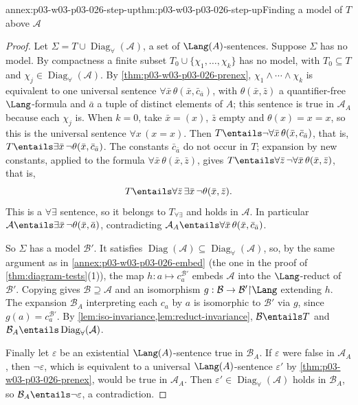 \begin{annexitem}{annex:p03-w03-p03-026-step-up}{thm:p03-w03-p03-026-step-up}{Finding a model of \(T\) above \(\mathcal A\)}
\begin{proof}
Let \(\Sigma=T\cup\operatorname{Diag}_{\forall}(\mathcal A)\), a set of
\(\Lang(A)\)-sentences.  Suppose \(\Sigma\) has no model.  By compactness a
finite subset \(T_0\cup\{\chi_1,\ldots,\chi_k\}\) has no model, with
\(T_0\subseteq T\) and \(\chi_j\in\operatorname{Diag}_{\forall}(\mathcal A)\).
By \cref{thm:p03-w03-p03-026-prenex}, \(\chi_1\land\cdots\land\chi_k\) is
equivalent to one universal sentence
\(\forall\bar x\,\theta(\bar x,\bar c_{\bar a})\), with
\(\theta(\bar x,\bar z)\) a quantifier-free \(\Lang\)-formula and \(\bar a\)
a tuple of distinct elements of \(A\); this sentence is true in
\(\mathcal A_A\) because each \(\chi_j\) is. When \(k=0\), take
\(\bar x=(x)\), \(\bar z\) empty and \(\theta(x)=x=x\), so this is
the universal sentence \(\forall x\,(x=x)\).  Then
\(T\entails\neg\forall\bar x\,\theta(\bar x,\bar c_{\bar a})\), that is,
\(T\entails\exists\bar x\,\neg\theta(\bar x,\bar c_{\bar a})\).  The
constants \(\bar c_{\bar a}\) do not occur in \(T\); expansion by new
constants, applied to the formula \(\forall\bar x\,\theta(\bar x,\bar z)\),
gives \(T\entails\forall\bar z\,\neg\forall\bar x\,\theta(\bar x,\bar z)\),
that is,
\[
 T\entails\forall\bar z\,\exists\bar x\,\neg\theta(\bar x,\bar z).
\]
This is a \(\forall\exists\) sentence, so it belongs to
\(T_{\forall\exists}\) and holds in \(\mathcal A\).  In particular
\(\mathcal A\entails\exists\bar x\,\neg\theta(\bar x,\bar a)\), contradicting
\(\mathcal A_A\entails\forall\bar x\,\theta(\bar x,\bar c_{\bar a})\).

So \(\Sigma\) has a model \(\mathcal B'\).  It satisfies
\(\operatorname{Diag}(\mathcal A)\subseteq\operatorname{Diag}_{\forall}(\mathcal A)\),
so, by the same argument as in \cref{annex:p03-w03-p03-026-embed} (the one
in the proof of \cref{thm:diagram-tests}(1)), the map
\(h:a\mapsto c_a^{\mathcal B'}\) embeds \(\mathcal A\) into the
\(\Lang\)-reduct of \(\mathcal B'\).  Copying gives
\(\mathcal B\supseteq\mathcal A\) and an isomorphism
\(g:\mathcal B\to\mathcal B'{\restriction}\Lang\) extending \(h\).  The
expansion \(\mathcal B_A\) interpreting each \(c_a\) by \(a\) is isomorphic
to \(\mathcal B'\) via \(g\), since \(g(a)=c_a^{\mathcal B'}\).  By
\cref{lem:iso-invariance,lem:reduct-invariance},
\(\mathcal B\entails T\) and
\(\mathcal B_A\entails\operatorname{Diag}_{\forall}(\mathcal A)\).

Finally let \(\varepsilon\) be an existential \(\Lang(A)\)-sentence true in
\(\mathcal B_A\).  If \(\varepsilon\) were false in \(\mathcal A_A\), then
\(\neg\varepsilon\), which is equivalent to a universal
\(\Lang(A)\)-sentence \(\varepsilon'\) by \cref{thm:p03-w03-p03-026-prenex},
would be true in \(\mathcal A_A\).  Then
\(\varepsilon'\in\operatorname{Diag}_{\forall}(\mathcal A)\) holds in
\(\mathcal B_A\), so \(\mathcal B_A\entails\neg\varepsilon\), a
contradiction.
\end{proof}
\end{annexitem}

